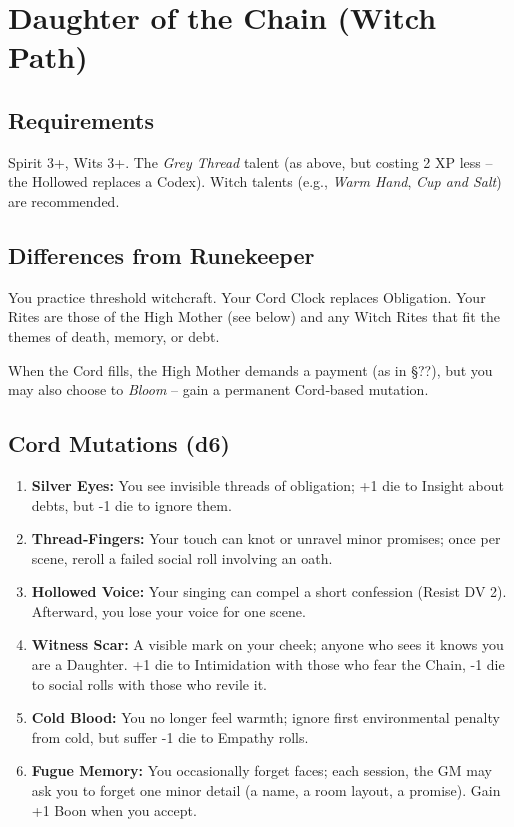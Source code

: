 \documentclass[10pt,twoside]{book}
\begin{document}
\section{Daughter of the Chain (Witch Path)}
\subsection*{Requirements}
Spirit 3+, Wits 3+. The \textit{Grey Thread} talent (as above, but costing 2 XP less – the Hollowed replaces a Codex). Witch talents (e.g., \textit{Warm Hand}, \textit{Cup and Salt}) are recommended.

\subsection*{Differences from Runekeeper}
You practice threshold witchcraft. Your Cord Clock replaces Obligation. Your Rites are those of the High Mother (see below) and any Witch Rites that fit the themes of death, memory, or debt.

When the Cord fills, the High Mother demands a payment (as in §??), but you may also choose to \textit{Bloom} – gain a permanent Cord‑based mutation.

\subsection*{Cord Mutations (d6)}
\begin{enumerate}
\item \textbf{Silver Eyes:} You see invisible threads of obligation; +1 die to Insight about debts, but -1 die to ignore them.
\item \textbf{Thread‑Fingers:} Your touch can knot or unravel minor promises; once per scene, reroll a failed social roll involving an oath.
\item \textbf{Hollowed Voice:} Your singing can compel a short confession (Resist DV 2). Afterward, you lose your voice for one scene.
\item \textbf{Witness Scar:} A visible mark on your cheek; anyone who sees it knows you are a Daughter. +1 die to Intimidation with those who fear the Chain, -1 die to social rolls with those who revile it.
\item \textbf{Cold Blood:} You no longer feel warmth; ignore first environmental penalty from cold, but suffer -1 die to Empathy rolls.
\item \textbf{Fugue Memory:} You occasionally forget faces; each session, the GM may ask you to forget one minor detail (a name, a room layout, a promise). Gain +1 Boon when you accept.
\end{enumerate}
\end{document}
